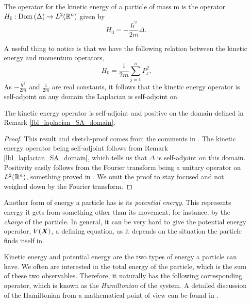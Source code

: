 \begin{definition}
  The operator for the kinetic energy of a particle of mass m is the operator $H_0: \operatorname{Dom}\left(\Delta\right) \to L^2(\mathbb{R}^n)$ given by \[H_0 = -\frac{\hbar^2}{2m} \Delta.\]
\end{definition}
\begin{remark}
  A useful thing to notice is that we have the following relation between the kinetic energy and momentum operators,
  \begin{equation*}
    H_0 = \frac{1}{2m}\sum_{j = 1}^{n} P_{j}^{2}.
  \end{equation*}
  As $-\frac{\hbar^2}{2m}$ and $\frac{1}{2m}$ are real constants, it follows that the kinetic energy operator is self-adjoint on any domain the Laplacian is self-adjoint on.
\end{remark}
\begin{proposition}\label{lbl_KE_positive}
  The kinetic energy operator is self-adjoint and positive on the domain defined in Remark \eqref{lbl_laplacian_SA_domain}.
\end{proposition}
\begin{proof}
  This result and sketch-proof comes from the comments in {\cite[p. 188]{Hall2013}}. The kinetic energy operator being self-adjoint follows from Remark \eqref{lbl_laplacian_SA_domain}, which tells us that $\Delta$ is self-adjoint on this domain. Positivity easily follows from the Fourier transform being a unitary operator on $L^2(\mathbb{R}^n)$, something proved in {\cite[Theorem 7.5]{teschl}}. We omit the proof to stay focused and not weighed down by the Fourier transform.
\end{proof}

Another form of energy a particle has is its {\emph{potential energy}}. This represents energy it gets from something other than its movement; for instance, by the {\emph{charge}} of the particle. In general, it can be very hard to give the potential energy operator, $V(\boldsymbol{X})$, a defining equation, as it depends on the situation the particle finds itself in.

\medskip

Kinetic energy and potential energy are the two types of energy a particle can have. We often are interested in the total energy of the particle, which is the sum of these two observables. Therefore, it naturally has the following corresponding operator, which is known as the {\emph{Hamiltonian}} of the system. A detailed discussion of the Hamiltonian from a mathematical point of view can be found in {\cite[Chapter 11.4]{kreyszig}}.

